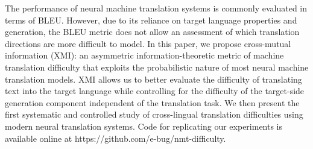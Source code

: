 The performance of neural machine translation systems is commonly evaluated in terms of BLEU. However, due to its reliance on target language properties and generation, the BLEU metric does not allow an assessment of which translation directions are more difficult to model. In this paper, we propose cross-mutual information (XMI): an asymmetric information-theoretic metric of machine translation difficulty that exploits the probabilistic nature of most neural machine translation models. XMI allows us to better evaluate the difficulty of translating text into the target language while controlling for the difficulty of the target-side generation component independent of the translation task. We then present the first systematic and controlled study of cross-lingual translation difficulties using modern neural translation systems. Code for replicating our experiments is available online at https://github.com/e-bug/nmt-difficulty.
